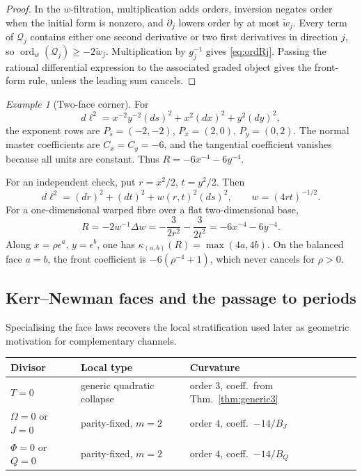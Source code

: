 \documentclass[11pt,a4paper]{article}
\theoremstyle{definition}
\theoremstyle{remark}
\newtheorem{example}[theorem]{Example}
\newcommand{\ord}{\operatorname{ord}}
\begin{document}
\begin{proof}
In the \(w\)-filtration, multiplication adds orders, inversion negates order
when the initial form is nonzero, and \(\partial_j\) lowers order by at most
\(\widetilde w_j\). Every term of \(\mathcal Q_j\) contains either one second
derivative or two first derivatives in direction \(j\), so
\(\ord_w(\mathcal Q_j)\ge-2\widetilde w_j\). Multiplication by \(g_j^{-1}\) gives
\eqref{eq:ordRj}. Passing the rational differential expression to the associated
graded object gives the front-form rule, unless the leading sum cancels.
\end{proof}

\begin{example}[Two-face corner]
\label{ex:twoface}
For
\[
d\ell^2=x^{-2}y^{-2}(ds)^2+x^2(dx)^2+y^2(dy)^2,
\]
the exponent rows are \(P_s=(-2,-2)\), \(P_x=(2,0)\), \(P_y=(0,2)\). The normal
master coefficients are \(C_x=C_y=-6\), and the tangential coefficient vanishes
because all units are constant. Thus \(R=-6x^{-4}-6y^{-4}\).

For an independent check, put \(r=x^2/2\), \(t=y^2/2\). Then
\[
d\ell^2=(dr)^2+(dt)^2+w(r,t)^2(ds)^2,
\qquad
w=(4rt)^{-1/2}.
\]
For a one-dimensional warped fibre over a flat two-dimensional base,
\[
R=-2w^{-1}\Delta w
=
-\frac{3}{2r^2}-\frac{3}{2t^2}
=
-6x^{-4}-6y^{-4}.
\]
Along \(x=\rho\epsilon^a\), \(y=\epsilon^b\), one has
\(\kappa_{(a,b)}(R)=\max(4a,4b)\). On the balanced face \(a=b\), the front
coefficient is \(-6(\rho^{-4}+1)\), which never cancels for \(\rho>0\).
\end{example}

\subsection{Kerr--Newman faces and the passage to periods}

Specialising the face laws recovers the local stratification used later as
geometric motivation for complementary channels.

\begin{center}
\begin{tabular}{@{}lll@{}}
\toprule
Divisor & Local type & Curvature\\
\midrule
\(T=0\) & generic quadratic collapse & order \(3\), coeff.\ from Thm.~\ref{thm:generic3}\\
\(\Omega=0\) or \(J=0\) & parity-fixed, \(m=2\) & order \(4\), coeff.\ \(-14/B_J\)\\
\(\Phi=0\) or \(Q=0\) & parity-fixed, \(m=2\) & order \(4\), coeff.\ \(-14/B_Q\)\\
\bottomrule
\end{tabular}
\end{center}
\end{document}
